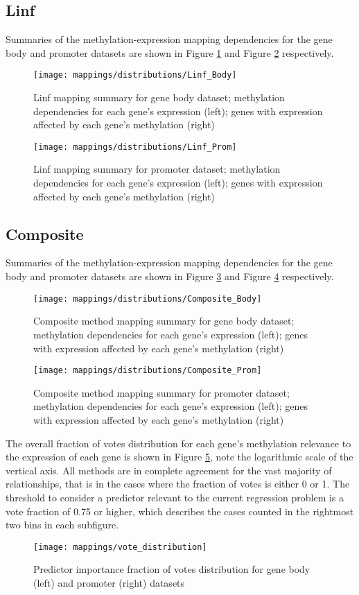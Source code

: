 \subsection{Linf}
Summaries of the methylation-expression mapping dependencies for the gene body and promoter datasets are shown in Figure \ref{fig:map_body_linf} and Figure \ref{fig:map_prom_linf} respectively.
\begin{figure}[H]
	\centering
	\texttt{[image: mappings/distributions/Linf\_Body]}
	\caption{Linf mapping summary for gene body dataset; methylation dependencies for each gene's expression (left); genes with expression affected by each gene's methylation (right)}
	\label{fig:map_body_linf}
\end{figure}
\begin{figure}[H]
	\centering
	\texttt{[image: mappings/distributions/Linf\_Prom]}
	\caption{Linf mapping summary for promoter dataset; methylation dependencies for each gene's expression (left); genes with expression affected by each gene's methylation (right)}
	\label{fig:map_prom_linf}
\end{figure}
\pagebreak


\subsection{Composite}
Summaries of the methylation-expression mapping dependencies for the gene body and promoter datasets are shown in Figure \ref{fig:map_body_comp} and Figure \ref{fig:map_prom_comp} respectively.
\begin{figure}[H]
	\centering
	\texttt{[image: mappings/distributions/Composite\_Body]}
	\caption{Composite method mapping summary for gene body dataset; methylation dependencies for each gene's expression (left); genes with expression affected by each gene's methylation (right)}
	\label{fig:map_body_comp}
\end{figure}
\begin{figure}[H]
	\centering
	\texttt{[image: mappings/distributions/Composite\_Prom]}
	\caption{Composite method mapping summary for promoter dataset; methylation dependencies for each gene's expression (left); genes with expression affected by each gene's methylation (right)}
	\label{fig:map_prom_comp}
\end{figure}
\pagebreak

The overall fraction of votes distribution for each gene's methylation relevance to the expression of each gene is shown in Figure \ref{fig:map_vote_dist}, note the logarithmic scale of the vertical axis. All methods are in complete agreement for the vast majority of relationships, that is in the cases where the fraction of votes is either 0 or 1. The threshold to consider a predictor relevant to the current regression problem is a vote fraction of 0.75 or higher, which describes the cases counted in the rightmost two bins in each subfigure.
\begin{figure}[H]
	\centering
	\texttt{[image: mappings/vote\_distribution]}
	\caption{Predictor importance fraction of votes distribution for gene body (left) and promoter (right) datasets}
	\label{fig:map_vote_dist}
\end{figure}


